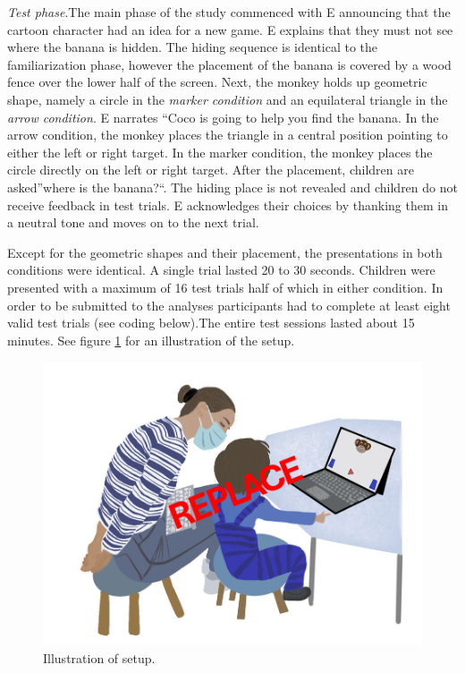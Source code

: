 \documentclass[
  man]{apa6}
\begin{document}
\emph{Test phase}.The main phase of the study commenced with E announcing that the cartoon character had an idea for a new game. E explains that they must not see where the banana is hidden. The hiding sequence is identical to the familiarization phase, however the placement of the banana is covered by a wood fence over the lower half of the screen. Next, the monkey holds up geometric shape, namely a circle in the \emph{marker condition} and an equilateral triangle in the \emph{arrow condition}. E narrates ``Coco is going to help you find the banana. In the arrow condition, the monkey places the triangle in a central position pointing to either the left or right target. In the marker condition, the monkey places the circle directly on the left or right target. After the placement, children are asked''where is the banana?{}``. The hiding place is not revealed and children do not receive feedback in test trials. E acknowledges their choices by thanking them in a neutral tone and moves on to the next trial.

Except for the geometric shapes and their placement, the presentations in both conditions were identical. A single trial lasted 20 to 30 seconds. Children were presented with a maximum of 16 test trials half of which in either condition. In order to be submitted to the analyses participants had to complete at least eight valid test trials (see coding below).The entire test sessions lasted about 15 minutes. See figure \ref{fig:pilot1illustration} for an illustration of the setup.



\begin{figure}

{\centering \includegraphics{./illustrations/Symlit_Rep_Setup} 

}

\caption{Illustration of setup.}\label{fig:pilot1illustration}
\end{figure}
\end{document}
